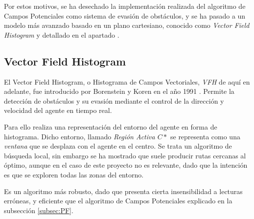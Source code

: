 Por estos motivos, se ha desechado la implementación realizada del algoritmo de Campos Potenciales como sistema de evasión de obstáculos, y se ha pasado a un modelo más avanzado basado en un plano cartesiano, conocido como \textit{Vector Field Histogram} y detallado en el apartado . 

\subsection{Vector Field Histogram}
\label{subsec:VFH}
El Vector Field Histogram, o Histograma de Campos Vectoriales, \textit{VFH} de aquí en adelante, fue introducido por Borenstein y Koren en el año 1991 \citep{art:BorensteinKorenVFH, art:BorensteinKorenFMCE}. Permite la detección de obstáculos y su evasión mediante el control de la dirección y velocidad del agente en tiempo 
real.

Para ello realiza una representación del entorno del agente en forma de histograma. Dicho entorno, llamado \textit{Región Activa $C*$} se representa como una \textit{ventana} que se desplaza con el agente en el centro. Se trata un algoritmo de búsqueda local, sin embargo se ha mostrado que suele producir rutas cercanas al óptimo, aunque en el caso de este proyecto no es relevante, dado que la intención es que se exploren todas las zonas del entorno.

Es un algoritmo más robusto, dado que presenta cierta insensibilidad a lecturas erróneas, y eficiente que el algoritmo de Campos Potenciales explicado en la subsección \ref{subsec:PF}. 

